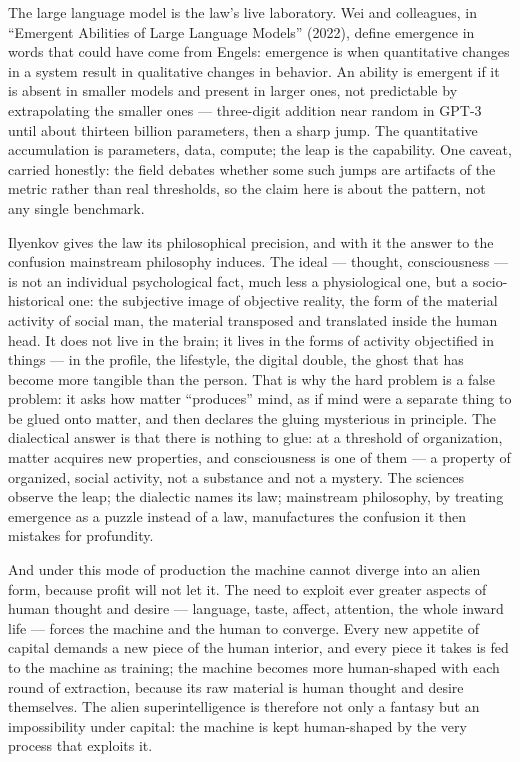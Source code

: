 \documentclass[11pt]{article}
\begin{document}
The large language model is the law's live laboratory. Wei and
colleagues, in ``Emergent Abilities of Large Language Models'' (2022),
define emergence in words that could have come from Engels: emergence
is when quantitative changes in a system result in qualitative changes
in behavior. An ability is emergent if it is absent in smaller models
and present in larger ones, not predictable by extrapolating the smaller
ones --- three-digit addition near random in GPT-3 until about thirteen
billion parameters, then a sharp jump. The quantitative accumulation is
parameters, data, compute; the leap is the capability. One caveat,
carried honestly: the field debates whether some such jumps are artifacts
of the metric rather than real thresholds, so the claim here is about
the pattern, not any single benchmark.

Ilyenkov gives the law its philosophical precision, and with it the
answer to the confusion mainstream philosophy induces. The ideal ---
thought, consciousness --- is not an individual psychological fact, much
less a physiological one, but a socio-historical one: the subjective
image of objective reality, the form of the material activity of social
man, the material transposed and translated inside the human head. It
does not live in the brain; it lives in the forms of activity
objectified in things --- in the profile, the lifestyle, the digital
double, the ghost that has become more tangible than the person. That
is why the hard problem is a false problem: it asks how matter
``produces'' mind, as if mind were a separate thing to be glued onto
matter, and then declares the gluing mysterious in principle. The
dialectical answer is that there is nothing to glue: at a threshold of
organization, matter acquires new properties, and consciousness is one
of them --- a property of organized, social activity, not a substance
and not a mystery. The sciences observe the leap; the dialectic names
its law; mainstream philosophy, by treating emergence as a puzzle
instead of a law, manufactures the confusion it then mistakes for
profundity.

And under this mode of production the machine cannot diverge into an
alien form, because profit will not let it. The need to exploit ever
greater aspects of human thought and desire --- language, taste, affect,
attention, the whole inward life --- forces the machine and the human to
converge. Every new appetite of capital demands a new piece of the human
interior, and every piece it takes is fed to the machine as training;
the machine becomes more human-shaped with each round of extraction,
because its raw material is human thought and desire themselves. The
alien superintelligence is therefore not only a fantasy but an
impossibility under capital: the machine is kept human-shaped by the
very process that exploits it.
\end{document}
